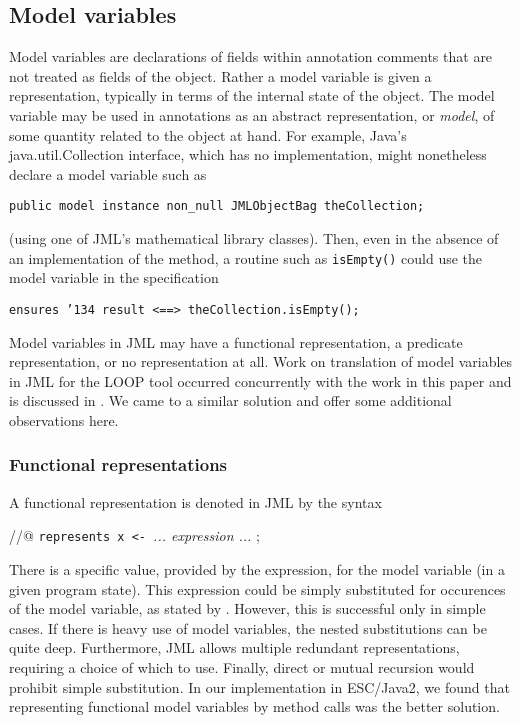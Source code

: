 \documentclass{sig-alternate}
\begin{document}
\subsection{Model variables}

Model variables are declarations of fields within annotation comments that are not treated
as fields of the object.  Rather a model variable is given a representation, typically in 
terms of the internal state of the object.  The model variable may be used in annotations
as an abstract representation, or {\em model}, of some quantity related to the object at hand.
For example, Java's java.util.Collection interface, which has no implementation, might 
nonetheless declare a model variable such as
\begin{center} \texttt{public model instance non\_null JMLObjectBag theCollection;} \end{center}
(using one of JML's mathematical library classes).  Then, even in the absence of an implementation of the method, a routine such as 
\texttt{isEmpty()} could use the model variable in the specification
\begin{center} \texttt{ensures \char'134 result <==> theCollection.isEmpty();} \end{center}

Model variables in JML may have a functional representation, a predicate representation, or 
no representation at all.  Work on translation of model variables in JML for the LOOP tool 
occurred concurrently with the work in this paper and is discussed in 
\cite{BreunessePoll03}.  We came to
a similar solution and offer some additional observations here.

\subsubsection {Functional representations}

A functional representation is denoted in JML by the syntax
\begin{center} //@ \texttt{represents x <- }{\em ... expression ... } ; \end{center}
There is a specific value, provided by the expression, for the model variable (in a given program 
state).   This expression could be simply substituted for occurences of the model variable, as
stated by \cite{BreunessePoll03}.  However, this is successful only in simple cases.  If there
is heavy use of model variables, the nested substitutions can be quite deep.  Furthermore,
JML allows multiple redundant representations, requiring a choice of which to use.  Finally,
direct or mutual recursion would prohibit simple substitution.  In our implementation in
ESC/Java2, we found that representing functional model variables by method
calls was the better
solution.
\end{document}
